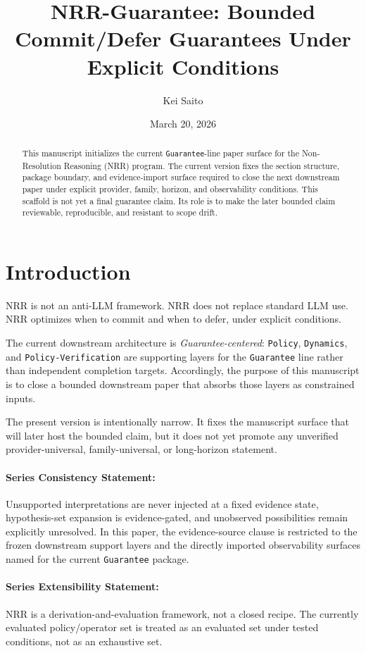 \documentclass[11pt]{article}
\title{NRR-Guarantee: Bounded Commit/Defer Guarantees Under Explicit Conditions}
\author{Kei Saito}
\date{March 20, 2026}
\begin{document}
\maketitle

\begin{abstract}
This manuscript initializes the current \texttt{Guarantee}-line paper surface for
the Non-Resolution Reasoning (NRR) program. The current version fixes the section
structure, package boundary, and evidence-import surface required to close the next
downstream paper under explicit provider, family, horizon, and observability
conditions. This scaffold is not yet a final guarantee claim. Its role is to make
the later bounded claim reviewable, reproducible, and resistant to scope drift.
\end{abstract}

\section{Introduction}

NRR is not an anti-LLM framework. NRR does not replace standard LLM use. NRR
optimizes when to commit and when to defer, under explicit conditions.

The current downstream architecture is \textit{Guarantee-centered}: \texttt{Policy},
\texttt{Dynamics}, and \texttt{Policy-Verification} are supporting layers for the
\texttt{Guarantee} line rather than independent completion targets. Accordingly, the
purpose of this manuscript is to close a bounded downstream paper that absorbs those
layers as constrained inputs.

The present version is intentionally narrow. It fixes the manuscript surface that
will later host the bounded claim, but it does not yet promote any unverified
provider-universal, family-universal, or long-horizon statement.

\paragraph{Series Consistency Statement:}
Unsupported interpretations are never injected at a fixed evidence state,
hypothesis-set expansion is evidence-gated, and unobserved possibilities remain
explicitly unresolved. In this paper, the evidence-source clause is restricted to
the frozen downstream support layers and the directly imported observability
surfaces named for the current \texttt{Guarantee} package.

\paragraph{Series Extensibility Statement:}
NRR is a derivation-and-evaluation framework, not a closed recipe. The currently
evaluated policy/operator set is treated as an evaluated set under tested
conditions, not as an exhaustive set.
\end{document}
